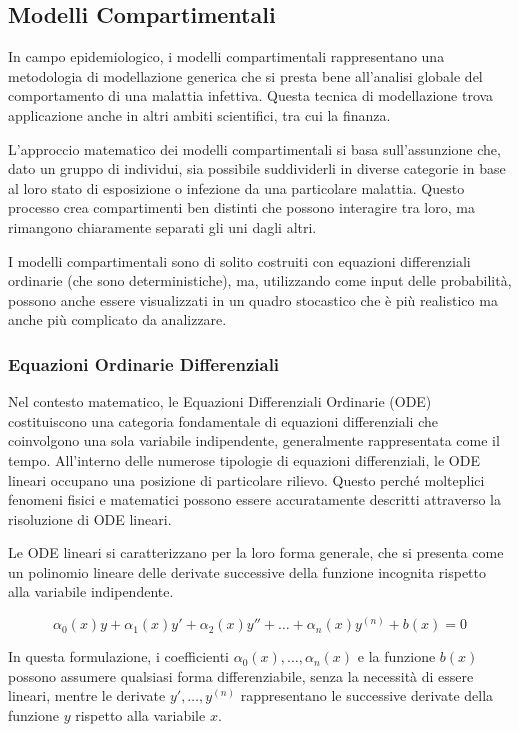 \subsection{Modelli Compartimentali}

In campo epidemiologico, i modelli compartimentali rappresentano una 
metodologia di modellazione generica che si presta bene all'analisi 
globale del comportamento di una malattia infettiva. Questa tecnica di 
modellazione trova applicazione anche in altri ambiti scientifici, tra 
cui la finanza.

L'approccio matematico dei modelli compartimentali si basa sull'assunzione 
che, dato un gruppo di individui, sia possibile suddividerli in diverse 
categorie in base al loro stato di esposizione o infezione da una 
particolare malattia. Questo processo crea compartimenti ben distinti che 
possono interagire tra loro, ma rimangono chiaramente separati gli uni 
dagli altri.

I modelli compartimentali sono di solito costruiti con equazioni differenziali 
ordinarie (che sono deterministiche), ma, utilizzando come input delle probabilità, 
possono anche essere visualizzati in un quadro stocastico che è più realistico ma 
anche più complicato da analizzare.

\subsubsection*{Equazioni Ordinarie Differenziali}

Nel contesto matematico, le Equazioni Differenziali Ordinarie (ODE) 
costituiscono una categoria fondamentale di equazioni differenziali 
che coinvolgono una sola variabile indipendente, generalmente 
rappresentata come il tempo. All'interno delle numerose tipologie di 
equazioni differenziali, le ODE lineari occupano una posizione di 
particolare rilievo. Questo perché molteplici fenomeni fisici e 
matematici possono essere accuratamente descritti attraverso la 
risoluzione di ODE lineari.

Le ODE lineari si caratterizzano per la loro forma generale, 
che si presenta come un polinomio lineare delle derivate successive 
della funzione incognita rispetto alla variabile indipendente.

$$\alpha_0(x)y + \alpha_1(x)y' + \alpha_2(x)y'' + \ldots + \alpha_n(x)y^{(n)} + b(x) = 0$$

In questa formulazione, i coefficienti $\alpha_0(x), \ldots, \alpha_n(x)$ 
e la funzione $b(x)$ possono assumere qualsiasi forma differenziabile, 
senza la necessità di essere lineari, mentre le derivate 
$y', \ldots, y^{(n)}$ rappresentano le successive derivate della funzione 
$y$ rispetto alla variabile $x$.

